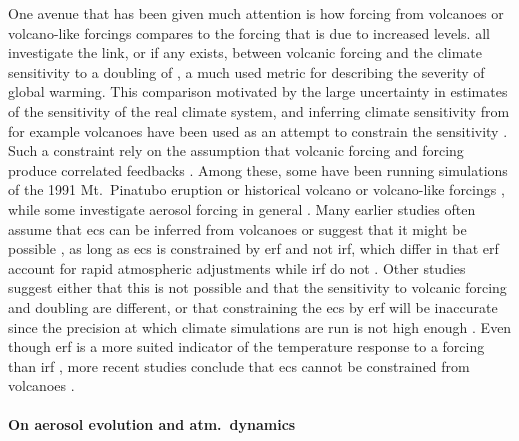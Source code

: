 \documentclass{ametsocV5}
\begin{document}
One avenue that has been given much attention is how forcing from volcanoes or
volcano-like forcings compares to the forcing that is due to increased  levels.
\citet{boer2007,marvel2016,merlis2014,ollila2016,richardson2019,salvi2022,wigley2005}
all investigate the link, or if any exists, between volcanic forcing and the climate
sensitivity to a doubling of , a much used metric for describing the severity of
global warming. This comparison motivated by the large uncertainty in estimates of the
sensitivity of the real climate system, and inferring climate sensitivity from for
example volcanoes have been used as an attempt to constrain the sensitivity
\citep{boer2007}.
Such a constraint rely on the assumption that volcanic forcing and  forcing
produce correlated feedbacks \citep{pauling2023}. Among these, some have been running
simulations of the 1991 Mt.\ Pinatubo eruption \citep{merlis2014,ollila2016} or
historical volcano or volcano-like forcings \citep{boer2007,marvel2016,wigley2005},
while some investigate aerosol forcing in general \citep{richardson2019,salvi2022}. Many
earlier studies often assume that \ac{ecs} can be inferred from volcanoes
\citep{wigley2005} or suggest that it might be possible \citep{bender2010}, as long as
\ac{ecs} is constrained by \ac{erf} and not \ac{irf},
which differ in that \ac{erf} account for rapid atmospheric adjustments while \ac{irf}
do not \citep{richardson2019}. Other studies suggest either that this is not possible
and that the sensitivity to volcanic forcing and  doubling are different, or
that constraining the \ac{ecs} by \ac{erf} will be inaccurate since the precision at
which climate simulations are run is not high enough
\citep{douglass2006,boer2007,salvi2022}. Even though \ac{erf} is a more suited indicator
of the temperature response to a forcing than \ac{irf}
\citep{marvel2016,richardson2019}, more recent studies conclude that \ac{ecs} cannot be
constrained from volcanoes \citep{pauling2023}.

\paragraph*{On aerosol evolution and atm.\ dynamics}
\end{document}
